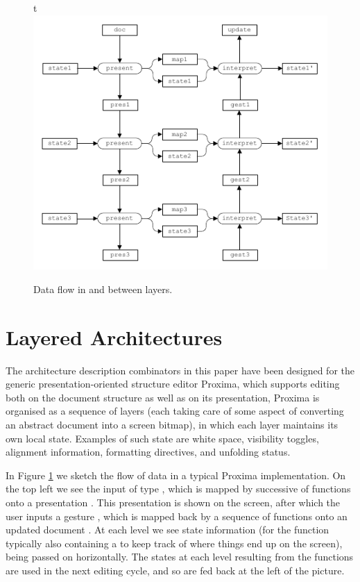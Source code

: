 \documentclass{llncs}
\begin{document}
			
			
\renewcommand{\textfraction}{0} 
\begin{figure}{t}
\includegraphics[width=\columnwidth]{images/LayersDataFlow}
\caption{Data flow in and between layers.} \label{explicit} 
\end{figure}													\section{Layered Architectures}\label{sect:layerInHaskell}

The architecture description combinators in this paper have been designed for the generic presentation-oriented structure editor Proxima, which supports editing both on the document structure as well as on its presentation, Proxima is organised as a sequence of layers (each taking care of some aspect of converting an abstract document into a screen bitmap), in which  each layer maintains its own local state. Examples of such state are white space, visibility toggles, alignment information, formatting directives, and unfolding status. 

In Figure \ref{explicit} we sketch the flow of data in a typical Proxima implementation. On the top left we see the input of type , which is mapped by successive of  functions onto a presentation . This presentation is shown on the screen, after which the user inputs a gesture , which is mapped back by a sequence of  functions onto an updated document . At each level we see state information (for the  function typically also containing a  to keep track of where things end up on the screen), being passed on horizontally. The states at each level resulting from the  functions are used in the next editing cycle, and so are fed back at the left of the picture.
	
\end{document}
